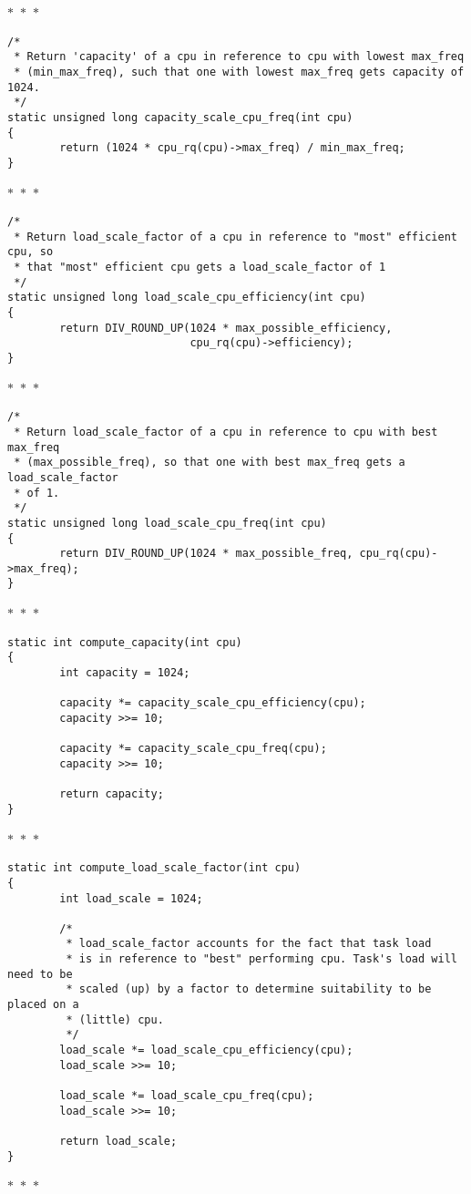 \documentclass{article}
\newcommand{\divider}{{\begin{center}
  $\ast$~$\ast$~$\ast$
\end{center}}}
\begin{document}
\divider
\begin{verbatim}
/*
 * Return 'capacity' of a cpu in reference to cpu with lowest max_freq
 * (min_max_freq), such that one with lowest max_freq gets capacity of 1024.
 */
static unsigned long capacity_scale_cpu_freq(int cpu)
{
        return (1024 * cpu_rq(cpu)->max_freq) / min_max_freq;
}
\end{verbatim}
\divider
\begin{verbatim}
/*
 * Return load_scale_factor of a cpu in reference to "most" efficient cpu, so
 * that "most" efficient cpu gets a load_scale_factor of 1
 */
static unsigned long load_scale_cpu_efficiency(int cpu)
{
        return DIV_ROUND_UP(1024 * max_possible_efficiency,
                            cpu_rq(cpu)->efficiency);
}
\end{verbatim}
\divider
\begin{verbatim}
/*
 * Return load_scale_factor of a cpu in reference to cpu with best max_freq
 * (max_possible_freq), so that one with best max_freq gets a load_scale_factor
 * of 1.
 */
static unsigned long load_scale_cpu_freq(int cpu)
{
        return DIV_ROUND_UP(1024 * max_possible_freq, cpu_rq(cpu)->max_freq);
}
\end{verbatim}
\divider
\begin{verbatim}
static int compute_capacity(int cpu)
{
        int capacity = 1024;

        capacity *= capacity_scale_cpu_efficiency(cpu);
        capacity >>= 10;

        capacity *= capacity_scale_cpu_freq(cpu);
        capacity >>= 10;

        return capacity;
}
\end{verbatim}
\divider
\begin{verbatim}
static int compute_load_scale_factor(int cpu)
{
        int load_scale = 1024;

        /*
         * load_scale_factor accounts for the fact that task load
         * is in reference to "best" performing cpu. Task's load will need to be
         * scaled (up) by a factor to determine suitability to be placed on a
         * (little) cpu.
         */
        load_scale *= load_scale_cpu_efficiency(cpu);
        load_scale >>= 10;

        load_scale *= load_scale_cpu_freq(cpu);
        load_scale >>= 10;

        return load_scale;
}
\end{verbatim}
\divider
\end{document}
